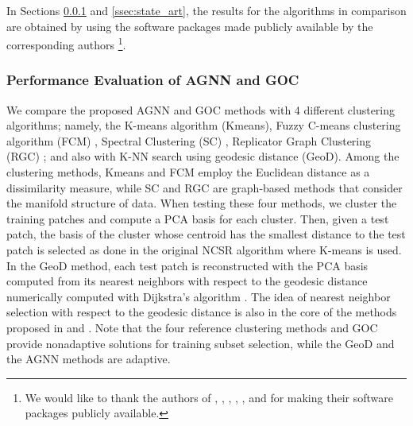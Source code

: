 \documentclass[journal]{IEEEtran}
\begin{document}
In Sections \ref{ssec:agnn_goc} and \ref{ssec:state_art}, the results for the algorithms in comparison are obtained by using the software packages made publicly available by the corresponding authors \footnote{We would like to thank the authors of \cite{Dong13nonlocally}, \cite{Dong11image}, \cite{Donoser13replicator}, \cite{Peleg14a},  \cite{Shi00normalized}, \cite{Bezdek1984} and \cite{Dijkstra59a} for making their software packages publicly available.}.



\subsubsection{Performance Evaluation of AGNN and GOC}
\label{ssec:agnn_goc}

We compare the proposed AGNN and GOC methods  with 4 different clustering algorithms; namely,  the K-means algorithm (Kmeans), Fuzzy C-means clustering algorithm (FCM) \cite{Bezdek1984}, Spectral Clustering (SC) \cite{Shi00normalized}, Replicator Graph Clustering (RGC) \cite{Donoser13replicator}; and also with K-NN search using geodesic distance (GeoD). Among the clustering methods,  Kmeans and FCM employ the Euclidean distance as a dissimilarity measure, while SC and RGC are graph-based methods that consider the manifold structure of data. When testing these four methods, we cluster the training patches and compute a PCA basis for each cluster. Then, given a test patch, the basis of the cluster whose centroid has the smallest distance to the test patch is selected as done in the original NCSR algorithm where K-means is used. In the GeoD method, each test patch is reconstructed with the PCA basis computed from its nearest neighbors with respect to the geodesic distance numerically computed with Dijkstra's algorithm \cite{Dijkstra59a}. The idea of nearest neighbor selection with respect to the geodesic distance is also in the core of the methods proposed in \cite{Turaga10nearest} and \cite{Chaudhry10fast}. Note that the four reference clustering methods and GOC provide nonadaptive solutions for training subset selection, while the GeoD and the AGNN methods are adaptive.
\end{document}
